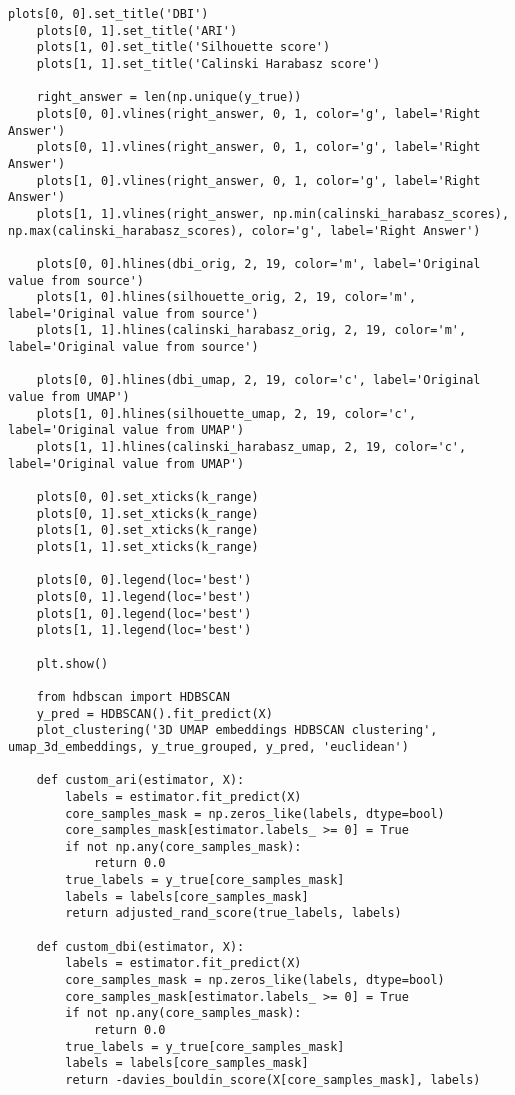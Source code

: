 \begin{lstlisting}[label=lst:1,caption=Кластеризация респондентов социологического исследования]
	plots[0, 0].set_title('DBI')
	plots[0, 1].set_title('ARI')
	plots[1, 0].set_title('Silhouette score')
	plots[1, 1].set_title('Calinski Harabasz score')
	
	right_answer = len(np.unique(y_true))
	plots[0, 0].vlines(right_answer, 0, 1, color='g', label='Right Answer')
	plots[0, 1].vlines(right_answer, 0, 1, color='g', label='Right Answer')
	plots[1, 0].vlines(right_answer, 0, 1, color='g', label='Right Answer')
	plots[1, 1].vlines(right_answer, np.min(calinski_harabasz_scores), np.max(calinski_harabasz_scores), color='g', label='Right Answer')
	
	plots[0, 0].hlines(dbi_orig, 2, 19, color='m', label='Original value from source')
	plots[1, 0].hlines(silhouette_orig, 2, 19, color='m', label='Original value from source')
	plots[1, 1].hlines(calinski_harabasz_orig, 2, 19, color='m', label='Original value from source')
	
	plots[0, 0].hlines(dbi_umap, 2, 19, color='c', label='Original value from UMAP')
	plots[1, 0].hlines(silhouette_umap, 2, 19, color='c', label='Original value from UMAP')
	plots[1, 1].hlines(calinski_harabasz_umap, 2, 19, color='c', label='Original value from UMAP')
	
	plots[0, 0].set_xticks(k_range)
	plots[0, 1].set_xticks(k_range)
	plots[1, 0].set_xticks(k_range)
	plots[1, 1].set_xticks(k_range)
	
	plots[0, 0].legend(loc='best')
	plots[0, 1].legend(loc='best')
	plots[1, 0].legend(loc='best')
	plots[1, 1].legend(loc='best')
	
	plt.show()
	
	from hdbscan import HDBSCAN
	y_pred = HDBSCAN().fit_predict(X)
	plot_clustering('3D UMAP embeddings HDBSCAN clustering', umap_3d_embeddings, y_true_grouped, y_pred, 'euclidean')
	
	def custom_ari(estimator, X):
		labels = estimator.fit_predict(X)
		core_samples_mask = np.zeros_like(labels, dtype=bool)
		core_samples_mask[estimator.labels_ >= 0] = True
		if not np.any(core_samples_mask):
			return 0.0
		true_labels = y_true[core_samples_mask]
		labels = labels[core_samples_mask]
		return adjusted_rand_score(true_labels, labels)
	
	def custom_dbi(estimator, X):
		labels = estimator.fit_predict(X)
		core_samples_mask = np.zeros_like(labels, dtype=bool)
		core_samples_mask[estimator.labels_ >= 0] = True
		if not np.any(core_samples_mask):
			return 0.0
		true_labels = y_true[core_samples_mask]
		labels = labels[core_samples_mask]
		return -davies_bouldin_score(X[core_samples_mask], labels)
	

\end{lstlisting}
